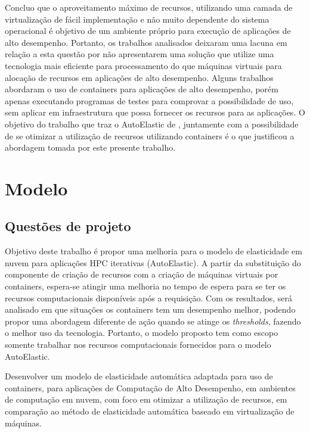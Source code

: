\documentclass[twoside,english,brazilian]{UNISINOSmonografia}
\begin{document}
Concluo que o aproveitamento máximo de recursos, utilizando uma camada de virtualização de fácil implementação e não muito dependente do sistema operacional é objetivo de um ambiente próprio para execução de aplicações de alto desempenho. Portanto, os trabalhos analisados deixaram uma lacuna em relação a esta questão por não apresentarem uma solução que utilize uma tecnologia mais eficiente para processamento do que máquinas virtuais para alocação de recursos em aplicações de alto desempenho. Alguns trabalhos abordaram o uso de containers para aplicações de alto desempenho, porém apenas executando programas de testes para comprovar a possibilidade de uso, sem aplicar em infraestrutura que possa fornecer os recursos para as aplicações. O objetivo do trabalho que traz o AutoElastic de , juntamente com a possibilidade de se otimizar a utilização de recursos utilizando containers é o que justificou a abordagem tomada por este presente trabalho.

\chapter{Modelo}
\label{model}

\section{Questões de projeto}
Objetivo deste trabalho é propor uma melhoria para o modelo de elasticidade em nuvem para aplicações HPC iterativas (AutoElastic). A partir da substituição do componente de criação de recursos com a criação de máquinas virtuais por containers, espera-se atingir uma melhoria no tempo de espera para se ter os recursos computacionais disponíveis após a requisição. Com os resultados, será analisado em que situações os containers tem um desempenho melhor, podendo propor uma abordagem diferente de ação quando se atinge os \textit{thresholds}, fazendo o melhor uso da tecnologia. Portanto, o modelo proposto tem como escopo somente trabalhar nos recursos computacionais fornecidos para o modelo AutoElastic. 

Desenvolver um modelo de elasticidade automática adaptada para uso de containers, para aplicações de Computação de Alto Desempenho, em ambientes de computação em nuvem, com foco em otimizar a utilização de recursos, em comparação ao método de elasticidade automática baseado em virtualização de máquinas.
\end{document}
